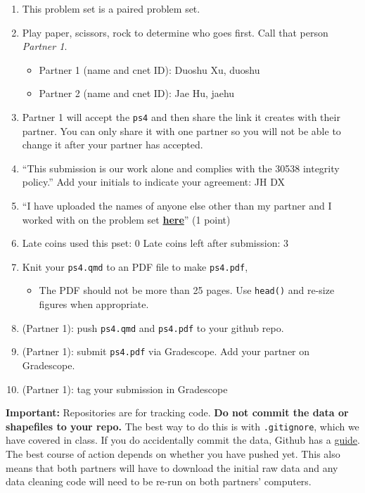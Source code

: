 \documentclass[
  letterpaper,
  DIV=11,
  numbers=noendperiod]{scrartcl}
\providecommand{\tightlist}{%
  \setlength{\itemsep}{0pt}\setlength{\parskip}{0pt}}\usepackage{longtable,booktabs,array}
\begin{document}
\begin{enumerate}
\def\labelenumi{\arabic{enumi}.}
\tightlist
\item
  This problem set is a paired problem set.
\item
  Play paper, scissors, rock to determine who goes first. Call that
  person \emph{Partner 1}.

  \begin{itemize}
  \tightlist
  \item
    Partner 1 (name and cnet ID): Duoshu Xu, duoshu
  \item
    Partner 2 (name and cnet ID): Jae Hu, jaehu
  \end{itemize}
\item
  Partner 1 will accept the \texttt{ps4} and then share the link it
  creates with their partner. You can only share it with one partner so
  you will not be able to change it after your partner has accepted.
\item
  ``This submission is our work alone and complies with the 30538
  integrity policy.'' Add your initials to indicate your agreement: JH
  DX
\item
  ``I have uploaded the names of anyone else other than my partner and I
  worked with on the problem set
  \textbf{\href{https://docs.google.com/forms/d/185usrCREQaUbvAXpWhChkjghdGgmAZXA3lPWpXLLsts/edit}{here}}''
  (1 point)
\item
  Late coins used this pset: 0 Late coins left after submission: 3
\item
  Knit your \texttt{ps4.qmd} to an PDF file to make \texttt{ps4.pdf},

  \begin{itemize}
  \tightlist
  \item
    The PDF should not be more than 25 pages. Use \texttt{head()} and
    re-size figures when appropriate.
  \end{itemize}
\item
  (Partner 1): push \texttt{ps4.qmd} and \texttt{ps4.pdf} to your github
  repo.
\item
  (Partner 1): submit \texttt{ps4.pdf} via Gradescope. Add your partner
  on Gradescope.
\item
  (Partner 1): tag your submission in Gradescope
\end{enumerate}

\textbf{Important:} Repositories are for tracking code. \textbf{Do not
commit the data or shapefiles to your repo.} The best way to do this is
with \texttt{.gitignore}, which we have covered in class. If you do
accidentally commit the data, Github has a
\href{https://docs.github.com/en/repositories/working-with-files/managing-large-files/about-large-files-on-github\#removing-files-from-a-repositorys-history}{guide}.
The best course of action depends on whether you have pushed yet. This
also means that both partners will have to download the initial raw data
and any data cleaning code will need to be re-run on both partners'
computers.
\end{document}
